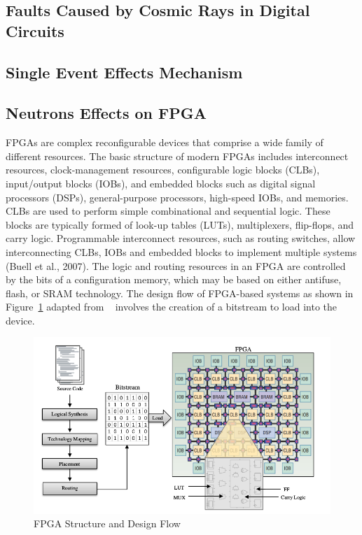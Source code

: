 \subsection{Faults Caused by Cosmic Rays in Digital Circuits}
\subsection{Single Event Effects Mechanism}
\subsection{Neutrons Effects on FPGA}





FPGAs are complex reconfigurable devices that comprise a wide family of different resources. The basic structure of modern FPGAs includes interconnect resources, clock-management resources, configurable logic blocks (CLBs), input/output
blocks (IOBs), and embedded blocks such as digital signal processors (DSPs), general-purpose processors, high-speed IOBs, and memories. CLBs are used to perform simple
combinational and sequential logic. These blocks are typically formed of look-up tables
(LUTs), multiplexers, flip-flops, and carry logic. Programmable interconnect resources, such
as routing switches, allow interconnecting CLBs, IOBs and embedded blocks to implement multiple systems (Buell et al., 2007).
The logic and routing resources in an FPGA are controlled by the bits of a configuration memory, which may be based on either antifuse, flash, or SRAM technology. The
design flow of FPGA-based systems as shown in Figure~\ref{fig:fpga-struct} adapted from ~\cite{hauck2010reconfigurable} involves the creation of a bitstream to load into the
device.



\begin{figure}[tb!]
 \centering
  \captionsetup{justification=centering}    
   \includegraphics[scale=0.4]{figures/img/FPGA-structure.png}
   \caption{FPGA Structure and Design Flow}
\label{fig:fpga-struct}
\end{figure}



